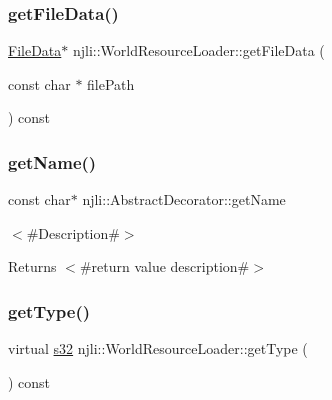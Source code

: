 \subsubsection{\texorpdfstring{get\+File\+Data()}{getFileData()}}
{\footnotesize\ttfamily \mbox{\hyperlink{structnjli_1_1_world_resource_loader_1_1_file_data}{File\+Data}}$\ast$ njli\+::\+World\+Resource\+Loader\+::get\+File\+Data (\begin{DoxyParamCaption}\item[{const char $\ast$}]{file\+Path }\end{DoxyParamCaption}) const\hspace{0.3cm}{\ttfamily [protected]}}

\mbox{\label{classnjli_1_1_world_resource_loader_ad41266885be835f3ee602311e20877a4}} 
\subsubsection{\texorpdfstring{get\+Name()}{getName()}}
{\footnotesize\ttfamily const char$\ast$ njli\+::\+Abstract\+Decorator\+::get\+Name}

$<$\#\+Description\#$>$

\begin{DoxyReturn}{Returns}
$<$\#return value description\#$>$ 
\end{DoxyReturn}
\mbox{\label{classnjli_1_1_world_resource_loader_a71de9ddba0101505458834f0fffba6b6}} 
\subsubsection{\texorpdfstring{get\+Type()}{getType()}\hspace{0.1cm}{\footnotesize\ttfamily [1/2]}}
{\footnotesize\ttfamily virtual \mbox{\hyperlink{_util_8h_aa62c75d314a0d1f37f79c4b73b2292e2}{s32}} njli\+::\+World\+Resource\+Loader\+::get\+Type (\begin{DoxyParamCaption}{ }\end{DoxyParamCaption}) const\hspace{0.3cm}{\ttfamily [virtual]}}



